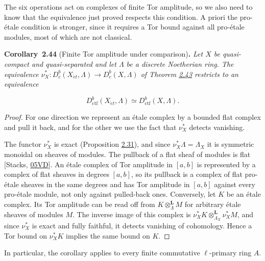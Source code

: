 \documentclass[11pt]{article}
\newenvironment{bpstatement}[2]{\par\addvspace{0.6\baselineskip}\noindent\textbf{#1}#2\textbf{.}\enspace\ignorespaces}
  {\par\addvspace{0.4\baselineskip}}
\newenvironment{bpstatementit}[2]{\begin{bpstatement}{#1}{#2}\itshape\ignorespaces}{\end{bpstatement}}
\providecommand{\Dbc}{}\renewcommand{\Dbc}{D^b_c}
\begin{document}
\label{bp131}%
The six operations act on complexes of finite Tor amplitude, so we also need to know that the equivalence just proved respects this condition. A priori the pro-étale condition is stronger, since it requires a Tor bound against all pro-étale modules, most of which are not classical.

\label{bp132}%
\begin{bpstatementit}{Corollary~2.44}{ (Finite Tor amplitude under comparison)}
Let \(X\) be quasi-compact and quasi-separated and let \(\Lambda\) be a discrete Noetherian ring. The equivalence \(\nu_X^*:D^b_c(X_{\acute{e}t},\Lambda)\to\Dbc(X,\Lambda)\) of Theorem \hyperref[bp129]{2.43} restricts to an equivalence

\[
D^b_{\mathrm{ctf}}(X_{\acute{e}t},\Lambda)\simeq D^b_{\mathrm{ctf}}(X,\Lambda).
\]
\end{bpstatementit}

\begin{proof}[{Proof}]\label{bp133}%
For one direction we represent an étale complex by a bounded flat complex and pull it back, and for the other we use the fact that \(\nu_X^*\) detects vanishing.

The functor \(\nu_X^*\) is exact (Proposition \hyperref[bp92]{2.31}), and since \(\nu_X^*\Lambda=\Lambda_X\) it is symmetric monoidal on sheaves of modules. The pullback of a flat sheaf of modules is flat [Stacks, \href{https://stacks.math.columbia.edu/tag/05VD}{05VD}]. An étale complex of Tor amplitude in \([a,b]\) is represented by a complex of flat sheaves in degrees \([a,b]\), so its pullback is a complex of flat pro-étale sheaves in the same degrees and has Tor amplitude in \([a,b]\) against every pro-étale module, not only against pulled-back ones. Conversely, let \(K\) be an étale complex. Its Tor amplitude can be read off from \(K\otimes^{\mathbf L}_\Lambda M\) for arbitrary étale sheaves of modules \(M\). The inverse image of this complex is \(\nu_X^*K\otimes^{\mathbf L}_{\Lambda_X}\nu_X^*M\), and since \(\nu_X^*\) is exact and fully faithful, it detects vanishing of cohomology. Hence a Tor bound on \(\nu_X^*K\) implies the same bound on \(K\).
\end{proof}

\label{bp134}%
In particular, the corollary applies to every finite commutative \(\ell\)-primary ring \(A\).
\end{document}
